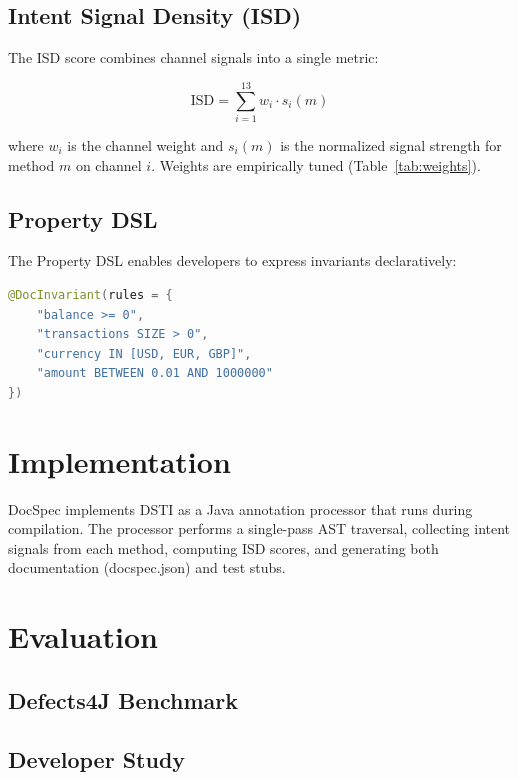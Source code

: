 \documentclass[sigconf,nonacm]{acmart}
\begin{document}
\subsection{Intent Signal Density (ISD)}

The ISD score combines channel signals into a single metric:

\begin{equation}
  \text{ISD} = \sum_{i=1}^{13} w_i \cdot s_i(m)
\end{equation}

where $w_i$ is the channel weight and $s_i(m)$ is the normalized signal
strength for method $m$ on channel $i$. Weights are empirically tuned
(Table~\ref{tab:weights}).

\subsection{Property DSL}

The Property DSL enables developers to express invariants declaratively:

\begin{lstlisting}[language=Java]
@DocInvariant(rules = {
    "balance >= 0",
    "transactions SIZE > 0",
    "currency IN [USD, EUR, GBP]",
    "amount BETWEEN 0.01 AND 1000000"
})
\end{lstlisting}

\section{Implementation}

DocSpec implements DSTI as a Java annotation processor that runs during
compilation. The processor performs a single-pass AST traversal,
collecting intent signals from each method, computing ISD scores, and
generating both documentation (docspec.json) and test stubs.

\section{Evaluation}

\subsection{Defects4J Benchmark}

\subsection{Developer Study}
\end{document}

